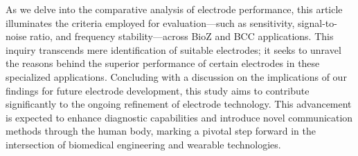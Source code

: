 As we delve into the comparative analysis of electrode performance, this article illuminates the criteria employed for evaluation—such as sensitivity, signal-to-noise ratio, and frequency stability—across BioZ and BCC applications. This inquiry transcends mere identification of suitable electrodes; it seeks to unravel the reasons behind the superior performance of certain electrodes in these specialized applications. Concluding with a discussion on the implications of our findings for future electrode development, this study aims to contribute significantly to the ongoing refinement of electrode technology. This advancement is expected to enhance diagnostic capabilities and introduce novel communication methods through the human body, marking a pivotal step forward in the intersection of biomedical engineering and wearable technologies.



